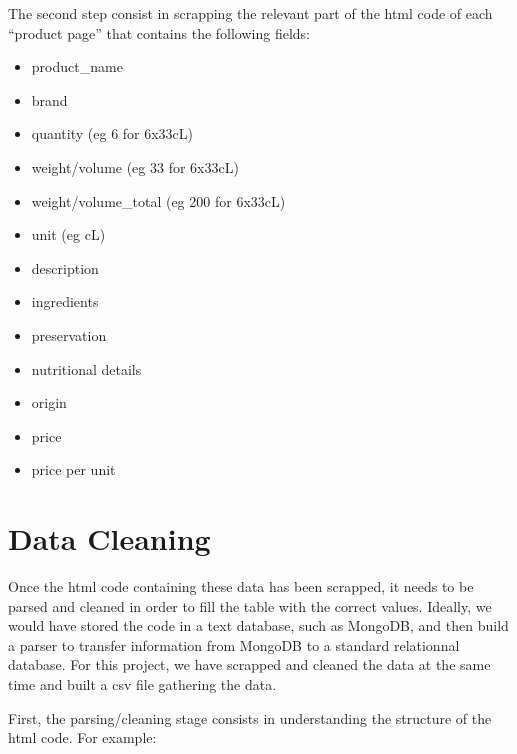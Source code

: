 \documentclass{article}
\begin{document}
The second step consist in scrapping the relevant part of the html code
of each ``product page'' that contains the following fields: 
\begin{itemize}
\item product\_name
\item brand 
\item quantity (eg 6 for 6x33cL) 
\item weight/volume (eg 33 for 6x33cL) 
\item weight/volume\_total (eg 200 for 6x33cL) 
\item unit (eg cL)
\item description 
\item ingredients 
\item preservation 
\item nutritional details
\item origin 
\item price 
\item price per unit
\end{itemize}


    \section{Data Cleaning}


    Once the html code containing these data has been scrapped, it needs to
be parsed and cleaned in order to fill the table with the correct
values. Ideally, we would have stored the code in a text database, such
as MongoDB, and then build a parser to transfer information from MongoDB
to a standard relationnal database. For this project, we have scrapped
and cleaned the data at the same time and built a csv file gathering the
data.

First, the parsing/cleaning stage consists in understanding the
structure of the html code. For example:
\end{document}
